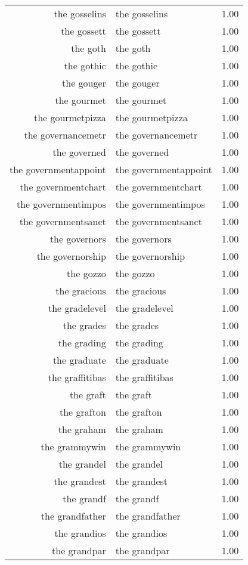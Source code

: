 \begin{table}[ht]
\begin{tabular}{rlr}
  the gosselins & the gosselins & 1.00 \\ 
  the gossett & the gossett & 1.00 \\ 
  the goth & the goth & 1.00 \\ 
  the gothic & the gothic & 1.00 \\ 
  the gouger & the gouger & 1.00 \\ 
  the gourmet & the gourmet & 1.00 \\ 
  the gourmetpizza & the gourmetpizza & 1.00 \\ 
  the governancemetr & the governancemetr & 1.00 \\ 
  the governed & the governed & 1.00 \\ 
  the governmentappoint & the governmentappoint & 1.00 \\ 
  the governmentchart & the governmentchart & 1.00 \\ 
  the governmentimpos & the governmentimpos & 1.00 \\ 
  the governmentsanct & the governmentsanct & 1.00 \\ 
  the governors & the governors & 1.00 \\ 
  the governorship & the governorship & 1.00 \\ 
  the gozzo & the gozzo & 1.00 \\ 
  the gracious & the gracious & 1.00 \\ 
  the gradelevel & the gradelevel & 1.00 \\ 
  the grades & the grades & 1.00 \\ 
  the grading & the grading & 1.00 \\ 
  the graduate & the graduate & 1.00 \\ 
  the graffitibas & the graffitibas & 1.00 \\ 
  the graft & the graft & 1.00 \\ 
  the grafton & the grafton & 1.00 \\ 
  the graham & the graham & 1.00 \\ 
  the grammywin & the grammywin & 1.00 \\ 
  the grandel & the grandel & 1.00 \\ 
  the grandest & the grandest & 1.00 \\ 
  the grandf & the grandf & 1.00 \\ 
  the grandfather & the grandfather & 1.00 \\ 
  the grandios & the grandios & 1.00 \\ 
  the grandpar & the grandpar & 1.00 \\ 

\end{tabular}
\end{table}
